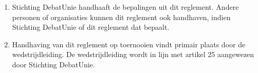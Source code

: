 
\begin{enumerate}
\item Stichting DebatUnie handhaaft de bepalingen uit dit reglement. Andere personen of organisaties kunnen dit reglement ook handhaven, indien Stichting DebatUnie of dit reglement dat bepaalt.
\item Handhaving van dit reglement op toernooien vindt primair plaats door de wedstrijdleiding. De wedstrijdleiding wordt in lijn met artikel 25 aangewezen door Stichting DebatUnie.
\end{enumerate}